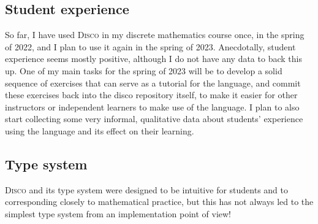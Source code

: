 \documentclass[submission,copyright,creativecommons]{eptcs}
\newcommand{\disco}{\textsc{Disco}\xspace}
\begin{document}
\subsection{Student experience}
\label{sec:students}

So far, I have used \disco in my discrete mathematics course once, in
the spring of 2022, and I plan to use it again in the spring of 2023.
Anecdotally, student experience seems mostly positive, although I do
not have any data to back this up.  One of my main tasks for the
spring of 2023 will be to develop a solid sequence of exercises that
can serve as a tutorial for the language, and commit these exercises
back into the disco repository itself, to make it easier for other
instructors or independent learners to make use of the language.  I
plan to also start collecting some very informal, qualitative data
about students' experience using the language and its effect on their
learning.

\subsection{Type system}
\label{sec:types}

\disco and its type system were designed to be intuitive for students
and to corresponding closely to mathematical practice, but this has
not always led to the simplest type system from an implementation
point of view!
\end{document}

